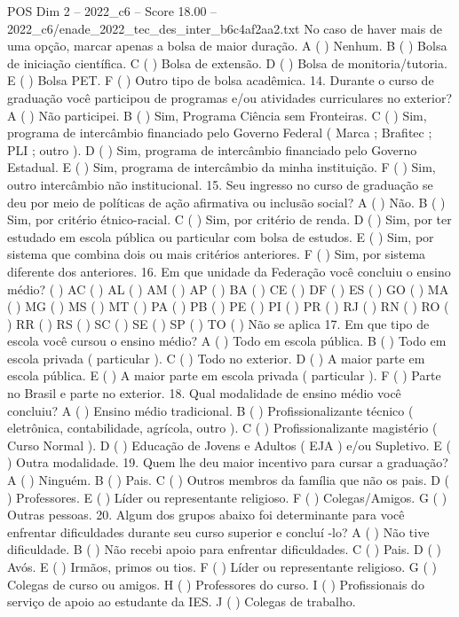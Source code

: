 \begin{textsample}{POS Dim 2 – 2022\_c6 – Score 18.00 – 2022\_c6/enade\_2022\_tec\_des\_inter\_b6c4af2aa2.txt}
No caso de haver mais de uma opção, marcar apenas a bolsa de maior duração.
A ( ) Nenhum.
B ( ) Bolsa de iniciação científica.
C ( ) Bolsa de extensão.
D ( ) Bolsa de monitoria/tutoria.
E ( ) Bolsa PET.
F ( ) Outro tipo de bolsa acadêmica. 14.
Durante o curso de graduação você participou de programas e/ou atividades curriculares no exterior?
A ( ) Não participei.
B ( ) Sim, Programa Ciência sem Fronteiras.
C ( ) Sim, programa de intercâmbio financiado pelo Governo Federal ( Marca ; Brafitec ; PLI ; outro ).
D ( ) Sim, programa de intercâmbio financiado pelo Governo Estadual.
E ( ) Sim, programa de intercâmbio da minha instituição.
F ( ) Sim, outro intercâmbio não institucional. 15.
Seu ingresso no curso de graduação se deu por meio de políticas de ação afirmativa ou inclusão social?
A ( ) Não.
B ( ) Sim, por critério étnico-racial.
C ( ) Sim, por critério de renda.
D ( ) Sim, por ter estudado em escola pública ou particular com bolsa de estudos.
E ( ) Sim, por sistema que combina dois ou mais critérios anteriores.
F ( ) Sim, por sistema diferente dos anteriores. 16.
Em que unidade da Federação você concluiu o ensino médio? ( ) AC ( ) AL ( ) AM ( ) AP ( ) BA ( ) CE ( ) DF ( ) ES ( ) GO ( ) MA ( ) MG ( ) MS ( ) MT ( ) PA ( ) PB ( ) PE ( ) PI ( ) PR ( ) RJ ( ) RN ( ) RO ( ) RR ( ) RS ( ) SC ( ) SE ( ) SP ( ) TO ( ) Não se aplica 17.
Em que tipo de escola você cursou o ensino médio?
A ( ) Todo em escola pública.
B ( ) Todo em escola privada ( particular ).
C ( ) Todo no exterior.
D ( ) A maior parte em escola pública.
E ( ) A maior parte em escola privada ( particular ).
F ( ) Parte no Brasil e parte no exterior. 18.
Qual modalidade de ensino médio você concluiu?
A ( ) Ensino médio tradicional.
B ( ) Profissionalizante técnico ( eletrônica, contabilidade, agrícola, outro ).
C ( ) Profissionalizante magistério ( Curso Normal ).
D ( ) Educação de Jovens e Adultos ( EJA ) e/ou Supletivo.
E ( ) Outra modalidade. 19.
Quem lhe deu maior incentivo para cursar a graduação?
A ( ) Ninguém.
B ( ) Pais.
C ( ) Outros membros da família que não os pais.
D ( ) Professores.
E ( ) Líder ou representante religioso.
F ( ) Colegas/Amigos.
G ( ) Outras pessoas. 20.
Algum dos grupos abaixo foi determinante para você enfrentar dificuldades durante seu curso superior e concluí -lo?
A ( ) Não tive dificuldade.
B ( ) Não recebi apoio para enfrentar dificuldades.
C ( ) Pais.
D ( ) Avós.
E ( ) Irmãos, primos ou tios.
F ( ) Líder ou representante religioso.
G ( ) Colegas de curso ou amigos.
H ( ) Professores do curso.
I ( ) Profissionais do serviço de apoio ao estudante da IES.
J ( ) Colegas de trabalho.

\end{textsample}
